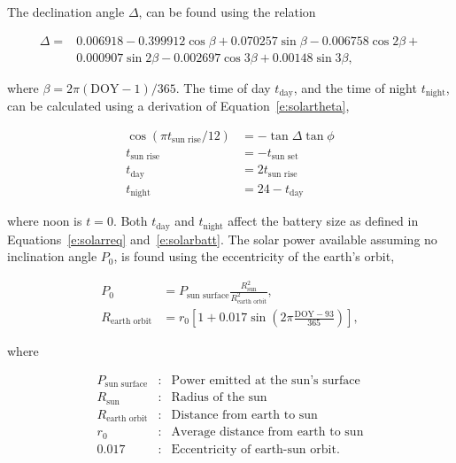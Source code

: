 \documentclass[]{aiaa-tc}%
\begin{document}
 The declination angle $\Delta$, can be found using the relation\cite{solar} 

    \begin{align}
        \label{e:solardelta}
        \Delta = &0.006918 - 0.399912 \cos{\beta} + 0.070257\sin{\beta} - 0.006758\cos{2\beta} + \nonumber \\
        & 0.000907\sin{2\beta} - 0.002697\cos{3\beta} + 0.00148\sin{3\beta},
    \end{align}

    where $\beta = 2\pi (\text{DOY}-1)/365$.
    The time of day $t_{\text{day}}$, and the time of night $t_{\text{night}}$, can be calculated using a derivation of Equation~\eqref{e:solartheta}, \cite{solar}

    \begin{align}
        \label{e:solartday}
        \cos{(\pi t_{\text{sun rise}}/12)} &= -\tan{\Delta} \tan{\phi} \\
        \label{e:solarsunrise}
        t_{\text{sun rise}} &= -t_{\text{sun set}} \\
        \label{e:solartday2}
        t_{\text{day}} &= 2t_{\text{sun rise}} \\
        \label{e:solartnight}
        t_{\text{night}} &= 24 - t_{\text{day}}
    \end{align}

    where noon is $t=0$. Both $t_{\text{day}}$ and $t_{\text{night}}$ affect the battery size as defined in Equations~\eqref{e:solarreq} and~\eqref{e:solarbatt}. The solar power available assuming no inclination angle $P_0$, is found using the eccentricity of the earth's orbit, 

    \begin{align}
        \label{e:solarp0}
        P_0 & = P_{\text{sun surface}} \frac{R_{\text{sun}}^2}{R_{\text{earth orbit}}^2}, \\
        \label{e:solareo}
        R_{\text{earth orbit}} & = r_0 \left[ 1 + 0.017 \sin{\left( 2\pi \frac{\text{DOY}-93}{365}\right)} \right],
    \end{align}
    
    where 

    \[ \begin{array}{lcl}
        P_{\text{sun surface}} & : & \text{Power emitted at the sun's surface} \\
        R_{\text{sun}} & : & \text{Radius of the sun} \\
        R_{\text{earth orbit}} & : & \text{Distance from earth to sun} \\
        r_0 & : & \text{Average distance from earth to sun} \\
        0.017 & : & \text{Eccentricity of earth-sun orbit}.
    \end{array} \]
\end{document}
